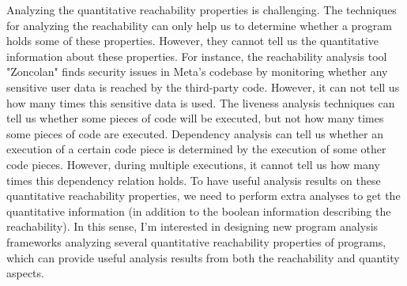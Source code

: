  Analyzing the quantitative reachability properties is challenging.
The techniques for analyzing the reachability can only help us to determine whether a program holds some of these properties.
However, they cannot tell us the quantitative information about these properties.
For instance, the reachability analysis tool
"Zoncolan" finds security issues in Meta's codebase by monitoring whether any sensitive user data is reached by the third-party code.
However, it can not tell us how many times this sensitive data is used.
The liveness analysis techniques can tell us whether some pieces of code will be executed, but not
how many times some pieces of code are executed.
Dependency analysis can tell us whether an execution of a certain code piece is determined by
the execution of some other code pieces.
However, during multiple executions,
it cannot tell us how many times this dependency relation holds.
To have useful analysis results on these quantitative reachability properties,
we need to perform extra analyses
to get the quantitative information
(in addition to the boolean information describing the reachability).
In this sense, I'm interested in designing
new program analysis frameworks analyzing several quantitative reachability properties of programs,
which can provide useful analysis results from both the reachability and quantity aspects.

